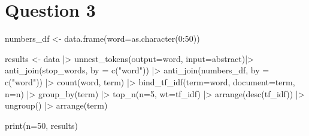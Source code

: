 \documentclass[
  letterpaper,
  DIV=11,
  numbers=noendperiod]{scrartcl}
\newenvironment{Shaded}{\begin{snugshade}}{\end{snugshade}}
\newcommand{\AttributeTok}[1]{\textcolor[rgb]{0.40,0.45,0.13}{#1}}
\newcommand{\DecValTok}[1]{\textcolor[rgb]{0.68,0.00,0.00}{#1}}
\newcommand{\FunctionTok}[1]{\textcolor[rgb]{0.28,0.35,0.67}{#1}}
\newcommand{\NormalTok}[1]{\textcolor[rgb]{0.00,0.23,0.31}{#1}}
\newcommand{\OtherTok}[1]{\textcolor[rgb]{0.00,0.23,0.31}{#1}}
\newcommand{\SpecialCharTok}[1]{\textcolor[rgb]{0.37,0.37,0.37}{#1}}
\newcommand{\StringTok}[1]{\textcolor[rgb]{0.13,0.47,0.30}{#1}}
\begin{document}
\hypertarget{question-3}{%
\section{Question 3}\label{question-3}}

\begin{Shaded}
\begin{Highlighting}[]
\NormalTok{numbers\_df }\OtherTok{\textless{}{-}} \FunctionTok{data.frame}\NormalTok{(}\AttributeTok{word=}\FunctionTok{as.character}\NormalTok{(}\DecValTok{0}\SpecialCharTok{:}\DecValTok{50}\NormalTok{))}

\NormalTok{results }\OtherTok{\textless{}{-}}\NormalTok{ data }\SpecialCharTok{|\textgreater{}} \FunctionTok{unnest\_tokens}\NormalTok{(}\AttributeTok{output=}\NormalTok{word, }\AttributeTok{input=}\NormalTok{abstract)}\SpecialCharTok{|\textgreater{}}
  \FunctionTok{anti\_join}\NormalTok{(stop\_words, }\AttributeTok{by =} \FunctionTok{c}\NormalTok{(}\StringTok{"word"}\NormalTok{)) }\SpecialCharTok{|\textgreater{}}
  \FunctionTok{anti\_join}\NormalTok{(numbers\_df, }\AttributeTok{by =} \FunctionTok{c}\NormalTok{(}\StringTok{"word"}\NormalTok{)) }\SpecialCharTok{|\textgreater{}}
  \FunctionTok{count}\NormalTok{(word, term) }\SpecialCharTok{|\textgreater{}}
  \FunctionTok{bind\_tf\_idf}\NormalTok{(}\AttributeTok{term=}\NormalTok{word, }\AttributeTok{document=}\NormalTok{term, }\AttributeTok{n=}\NormalTok{n) }\SpecialCharTok{|\textgreater{}}
  \FunctionTok{group\_by}\NormalTok{(term) }\SpecialCharTok{|\textgreater{}}
  \FunctionTok{top\_n}\NormalTok{(}\AttributeTok{n=}\DecValTok{5}\NormalTok{, }\AttributeTok{wt=}\NormalTok{tf\_idf) }\SpecialCharTok{|\textgreater{}}
  \FunctionTok{arrange}\NormalTok{(}\FunctionTok{desc}\NormalTok{(tf\_idf)) }\SpecialCharTok{|\textgreater{}}
  \FunctionTok{ungroup}\NormalTok{() }\SpecialCharTok{|\textgreater{}}
  \FunctionTok{arrange}\NormalTok{(term)}

\FunctionTok{print}\NormalTok{(}\AttributeTok{n=}\DecValTok{50}\NormalTok{, results)}
\end{Highlighting}
\end{Shaded}
\end{document}
